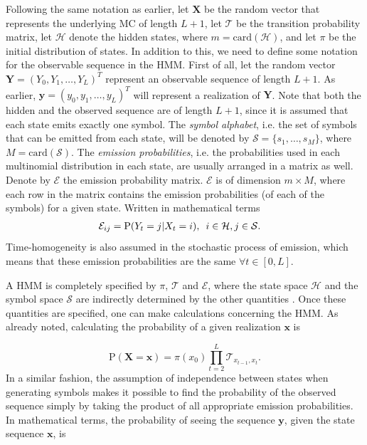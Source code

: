 \documentclass{article}\usepackage[]{graphicx}\usepackage[]{color}
\begin{document}
Following the same notation as earlier, let $\mathbf{X}$ be the random vector that represents the underlying MC of length $L+1$, let $\mathcal{T}$ be the transition probability matrix, let $\mathcal{H}$ denote the hidden states, where $m = \text{card}(\mathcal{H})$, and let $\pi$ be the initial distribution of states. In addition to this, we need to define some notation for the observable sequence in the HMM. First of all, let the random vector $\mathbf{Y} = (Y_0, Y_1, \ldots, Y_L)^T$ represent an observable sequence of length $L+1$. As earlier, $\mathbf{y} = (y_0, y_1, \ldots, y_L)^T$ will represent a realization of $\mathbf{Y}$. Note that both the hidden and the observed sequence are of length $L+1$, since it is assumed that each state emits exactly one symbol. The \textit{symbol alphabet}, i.e. the set of symbols that can be emitted from each state, will be denoted by $\mathcal{S} = \{s_1, \ldots, s_M\}$, where $M = \text{card}(\mathcal{S})$. The \textit{emission probabilities}, i.e. the probabilities used in each multinomial distribution in each state, are usually arranged in a matrix as well. Denote by $\mathcal{E}$ the emission probability matrix. $\mathcal{E}$ is of dimension $m \times M$, where each row in the matrix contains the emission probabilities (of each of the symbols) for a given state. Written in mathematical terms 
\begin{align*}
    \mathcal{E}_{ij} &= \text{P}(Y_t = j|X_t = i), \hspace{0.5em} i \in \mathcal{H}, j \in \mathcal{S}.
\end{align*}
Time-homogeneity is also assumed in the stochastic process of emission, which means that these emission probabilities are the same $\forall t \in [0, L]$. 

A HMM is completely specified by $\pi$, $\mathcal{T}$ and $\mathcal{E}$, where the state space $\mathcal{H}$ and the symbol space $\mathcal{S}$ are indirectly determined by the other quantities \cite{Eddy04}. Once these quantities are specified, one can make calculations concerning the HMM. As already noted, calculating the probability of a given realization $\mathbf{x}$ is 

\begin{equation}
    \text{P}(\mathbf{X} = \mathbf{x}) = \pi(x_0)\prod_{t=2}^L\mathcal{T}_{x_{t-1}, x_t}.
    \label{ProbHiddenMC}
\end{equation}
In a similar fashion, the assumption of independence between states when generating symbols makes it possible to find the probability of the observed sequence simply by taking the product of all appropriate emission probabilities. In mathematical terms, the probability of seeing the sequence $\mathbf{y}$, given the state sequence $\mathbf{x}$, is 
\end{document}
